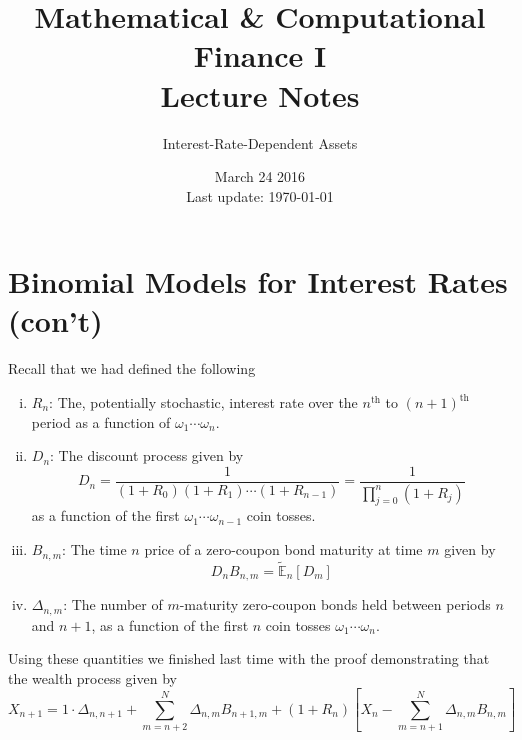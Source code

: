 \documentclass[12pt]{article}
\newcommand{\E}{\mathbb E}
\begin{document}
 
 
\title{Mathematical \& Computational Finance I\\Lecture Notes}
\author{Interest-Rate-Dependent Assets}
\date{March 24 2016 \\ Last update: \today{}}
\maketitle

\section{Binomial Models for Interest Rates (con't)}

Recall that we had defined the following
\begin{enumerate}[(i)]
	\item $R_n$: The, potentially stochastic, interest rate over the $n^\text{th}$  to $(n + 1)^\text{th}$ period as a function of $\omega_1\cdots\omega_n$.
	
	\item $D_n$: The discount process given by
	\begin{equation*}
	D_n = \frac{1}{ (1 + R_0)(1 + R_1) \cdots (1 + R_{n - 1})} = \frac{1}{ \prod^n_{j = 0} (1 + R_j) }
	\end{equation*}
	as a function of the first $\omega_1\cdots\omega_{n - 1}$ coin tosses.
	
	\item $B_{n,m}$: The time $n$ price of a zero-coupon bond maturity at time $m$ given by
	\begin{equation*}
		D_nB_{n,m} = \tilde{\E}_n[D_m]
	\end{equation*}
	
	\item $\Delta_{n,m}$: The number of $m$-maturity zero-coupon bonds held between periods $n$ and $n + 1$, as a function of the first $n$ coin tosses $\omega_1\cdots\omega_n$.
\end{enumerate}

Using these quantities we finished last time with the proof demonstrating that the wealth process given by
\begin{equation*}
	X_{n + 1} =  1\cdot\Delta_{n,n + 1} + \sum^N_{m = n + 2} \Delta_{n,m}B_{n + 1,m} + (1 + R_n)\left[X_n - \sum^N_{m = n + 1} \Delta_{n,m}B_{n,m} \right]
\end{equation*}
\end{document}
